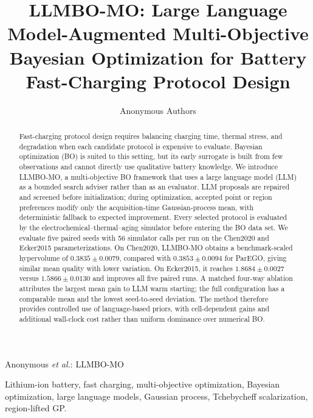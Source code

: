\documentclass[journal]{IEEEtran}
\begin{document}
\title{LLMBO-MO: Large Language Model-Augmented Multi-Objective Bayesian Optimization for Battery Fast-Charging Protocol Design}

\author{Anonymous Authors}

%
{Anonymous \MakeLowercase{\textit{et al.}}: LLMBO-MO}

\maketitle

\begin{abstract}
Fast-charging protocol design requires balancing charging time, thermal stress, and degradation when each candidate protocol is expensive to evaluate. Bayesian optimization (BO) is suited to this setting, but its early surrogate is built from few observations and cannot directly use qualitative battery knowledge. We introduce LLMBO-MO, a multi-objective BO framework that uses a large language model (LLM) as a bounded search adviser rather than as an evaluator. LLM proposals are repaired and screened before initialization; during optimization, accepted point or region preferences modify only the acquisition-time Gaussian-process mean, with deterministic fallback to expected improvement. Every selected protocol is evaluated by the electrochemical--thermal--aging simulator before entering the BO data set. We evaluate five paired seeds with 56 simulator calls per run on the Chen2020 and Ecker2015 parameterizations. On Chen2020, LLMBO-MO obtains a benchmark-scaled hypervolume of $0.3835\pm0.0079$, compared with $0.3853\pm0.0094$ for ParEGO, giving similar mean quality with lower variation. On Ecker2015, it reaches $1.8684\pm0.0027$ versus $1.5866\pm0.0130$ and improves all five paired runs. A matched four-way ablation attributes the largest mean gain to LLM warm starting; the full configuration has a comparable mean and the lowest seed-to-seed deviation. The method therefore provides controlled use of language-based priors, with cell-dependent gains and additional wall-clock cost rather than uniform dominance over numerical BO.
\end{abstract}

\begin{IEEEkeywords}
Lithium-ion battery, fast charging, multi-objective optimization, Bayesian optimization, large language models, Gaussian process, Tchebycheff scalarization, region-lifted GP.
\end{IEEEkeywords}
\end{document}
